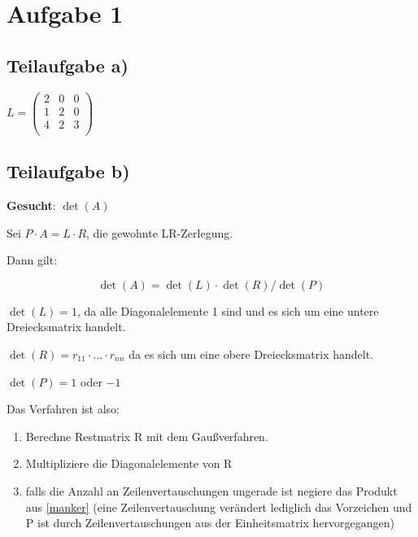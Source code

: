 \section*{Aufgabe 1}
\subsection*{Teilaufgabe a)}

$
L =
\begin{pmatrix}
2 & 0 & 0 \\
1 & 2 & 0 \\
4 & 2 & 3 \\
\end{pmatrix}
$


\subsection*{Teilaufgabe b)}
\textbf{Gesucht}: $\det(A)$

Sei $P \cdot A = L \cdot R$, die gewohnte LR-Zerlegung.

Dann gilt:

\[\det(A) = \det(L) \cdot \det(R) / \det(P)\]

$\det(L) = 1$, da alle Diagonalelemente 1 sind und es sich um eine untere Dreiecksmatrix handelt.

$\det(R) = r_{11} \cdot \ldots \cdot r_{nn} $ da es sich um eine obere Dreiecksmatrix handelt.


$\det(P) = 1$ oder $-1$

Das Verfahren ist also:
\begin{enumerate}
\item Berechne Restmatrix R mit dem Gaußverfahren.
\item \label{manker} Multipliziere die Diagonalelemente von R
\item falls die Anzahl an Zeilenvertauschungen ungerade ist negiere das Produkt aus \ref{manker} (eine Zeilenvertauschung verändert lediglich das Vorzeichen und P ist durch Zeilenvertauschungen aus der Einheitsmatrix hervorgegangen)
\end{enumerate}
